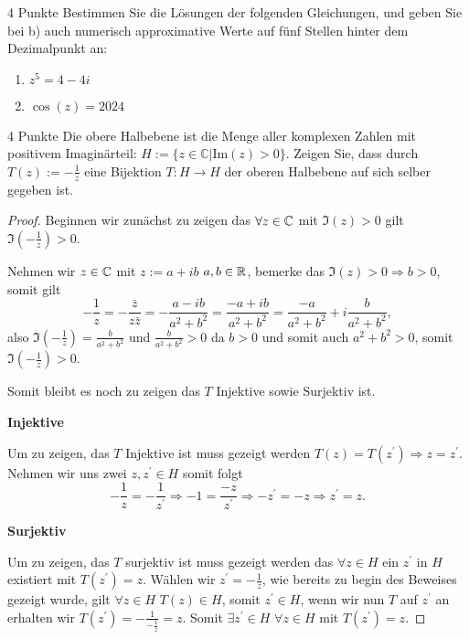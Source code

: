 \documentclass{problemset}
\begin{document}
\begin{problem}{4 Punkte}
Bestimmen Sie die Lösungen der folgenden Gleichungen, und geben Sie bei b) auch numerisch approximative Werte auf fünf Stellen hinter dem Dezimalpunkt an:
\begin{enumerate}
    \item $z^5 = 4 - 4i$
    \item $\cos(z) = 2024$
\end{enumerate}
\end{problem}

\begin{problem}{4 Punkte}
Die obere Halbebene ist die Menge aller komplexen Zahlen mit positivem Imaginärteil: $H := \{z \in \mathbb{C} | \text{Im}(z) > 0\}$. Zeigen Sie, dass durch $T(z) := -\frac{1}{z}$ eine Bijektion $T : H \rightarrow H$ der oberen Halbebene auf sich selber gegeben ist.

\begin{proof}
    Beginnen wir zunächst zu zeigen das $\forall z \in \mathbb{C}$ mit $\Im(z) > 0$ gilt $\Im(-\frac{1}{z}) > 0$.

    Nehmen wir $z \in \mathbb{C}$ mit $z := a + ib$ $a,b \in \mathbb{R}$, bemerke
    das $\Im(z) > 0 \Rightarrow b > 0$, somit gilt
    \[
        - \frac{1}{z} = - \frac{\bar{z}}{z\bar{z}} = - \frac{a - ib}{a^2 + b^2} = \frac{-a + ib}{a^2 + b^2} = \frac{-a}{a^2+b^2} + i\frac{b}{a^2+b^2},
    \] also $\Im(-\frac{1}{z}) = \frac{b}{a^2 + b^2}$ und $\frac{b}{a^2 + b^2}
       > 0$ da $b > 0$ und somit auch $a^2 + b^2 > 0$, somit $\Im(-\frac{1}{z})
       > 0$.

    Somit bleibt es noch zu zeigen das $T$ Injektive sowie Surjektiv ist.

    \textbf{Injektive}

    Um zu zeigen, das $T$ Injektive ist muss gezeigt werden $T(z) = T(z^\prime)
    \Rightarrow z = z^\prime$. Nehmen wir uns zwei $z, z^\prime \in H$ somit
    folgt
    \[
        - \frac{1}{z} = - \frac{1}{z^\prime} \Rightarrow -1 = \frac{-z}{z^\prime} \Rightarrow -z^\prime = -z \Rightarrow z^\prime = z.
    \]

    \textbf{Surjektiv}

    Um zu zeigen, das $T$ surjektiv ist muss gezeigt werden das $\forall z \in
    H$ ein $z^\prime$ in $H$ existiert mit $T(z^\prime) = z$. Wählen wir
    $z^\prime = - \frac{1}{z}$, wie bereits zu begin des Beweises gezeigt
    wurde, gilt $\forall z \in H$ $T(z) \in H$, somit $z^\prime \in H$, wenn
    wir nun $T$ auf $z^\prime$ an erhalten wir $T(z^\prime) =
    -\frac{1}{-\frac{1}{z}} = z$. Somit $\exists z^\prime \in H$ $\forall z \in
    H$ mit $T(z^\prime) = z$.

\end{proof}
\end{problem}
\end{document}
